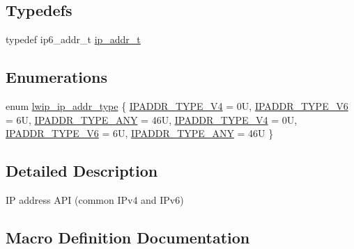 \subsection*{Typedefs}
\begin{DoxyCompactItemize}
\item 
typedef ip6\+\_\+addr\+\_\+t \hyperlink{openmote-cc2538_2lwip_2src_2include_2lwip_2ip__addr_8h_a88b43639738c4de2d3cd22e3a1fd7696}{ip\+\_\+addr\+\_\+t}
\end{DoxyCompactItemize}
\subsection*{Enumerations}
\begin{DoxyCompactItemize}
\item 
enum \hyperlink{group__ipaddr_gaf2142f0dfdcc938e2db16aa745ed585c}{lwip\+\_\+ip\+\_\+addr\+\_\+type} \{ \newline
\hyperlink{group__ipaddr_ggaf2142f0dfdcc938e2db16aa745ed585cace47fa82608deeb1c1c7c2c891eb5049}{I\+P\+A\+D\+D\+R\+\_\+\+T\+Y\+P\+E\+\_\+\+V4} = 0U, 
\hyperlink{group__ipaddr_ggaf2142f0dfdcc938e2db16aa745ed585caae510fd8ec7fe405b594b57af61f9a02}{I\+P\+A\+D\+D\+R\+\_\+\+T\+Y\+P\+E\+\_\+\+V6} = 6U, 
\hyperlink{group__ipaddr_ggaf2142f0dfdcc938e2db16aa745ed585cac6b2c99cf920e08efcb55dc40e42944e}{I\+P\+A\+D\+D\+R\+\_\+\+T\+Y\+P\+E\+\_\+\+A\+NY} = 46U, 
\hyperlink{group__ipaddr_ggaf2142f0dfdcc938e2db16aa745ed585cace47fa82608deeb1c1c7c2c891eb5049}{I\+P\+A\+D\+D\+R\+\_\+\+T\+Y\+P\+E\+\_\+\+V4} = 0U, 
\newline
\hyperlink{group__ipaddr_ggaf2142f0dfdcc938e2db16aa745ed585caae510fd8ec7fe405b594b57af61f9a02}{I\+P\+A\+D\+D\+R\+\_\+\+T\+Y\+P\+E\+\_\+\+V6} = 6U, 
\hyperlink{group__ipaddr_ggaf2142f0dfdcc938e2db16aa745ed585cac6b2c99cf920e08efcb55dc40e42944e}{I\+P\+A\+D\+D\+R\+\_\+\+T\+Y\+P\+E\+\_\+\+A\+NY} = 46U
 \}
\end{DoxyCompactItemize}


\subsection{Detailed Description}
IP address A\+PI (common I\+Pv4 and I\+Pv6) 

\subsection{Macro Definition Documentation}
\mbox{\label{openmote-cc2538_2lwip_2src_2include_2lwip_2ip__addr_8h_ae221446ab455b8a1a0d2a4153b9c1bb3}} 
